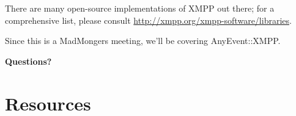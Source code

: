 \documentclass{article}
\begin{document}
\newpage
There are many open-source implementations of XMPP out there; for a comprehensive list,
please consult \url{http://xmpp.org/xmpp-software/libraries}.

\newpage
Since this is a MadMongers meeting, we'll be covering AnyEvent::XMPP.

\newpage

\vspace*{\fill}
\begin{center}
\textbf{\Huge Questions?}
\end{center}
\vspace*{\fill}

\newpage
\appendix
\section{Resources}
\end{document}
